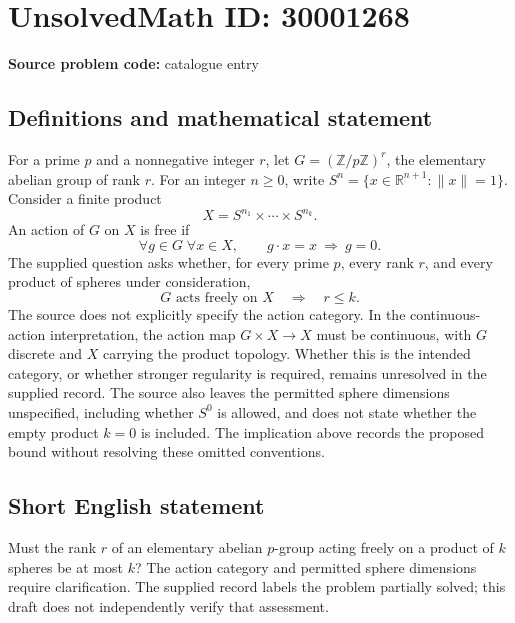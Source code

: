 \documentclass[11pt]{article}
\newcommand{\Z}{\mathbb{Z}}
\newcommand{\R}{\mathbb{R}}
\begin{document}
\section*{UnsolvedMath ID: 30001268}
\textbf{Source problem code:} catalogue entry
\subsection{Definitions and mathematical statement}
For a prime \(p\) and a nonnegative integer \(r\), let \(G=(\Z/p\Z)^r\), the elementary abelian group of rank \(r\). For an integer \(n\geq 0\), write \(S^n=\{x\in\R^{n+1}:\|x\|=1\}\). Consider a finite product
\[
X=S^{n_1}\times\cdots\times S^{n_k}.
\]
An action of \(G\) on \(X\) is free if
\[
\forall g\in G\;\forall x\in X,\qquad g\cdot x=x\ \Longrightarrow\ g=0.
\]
The supplied question asks whether, for every prime \(p\), every rank \(r\), and every product of spheres under consideration,
\[
G\text{ acts freely on }X\quad\Longrightarrow\quad r\leq k.
\]
The source does not explicitly specify the action category. In the continuous-action interpretation, the action map \(G\times X\to X\) must be continuous, with \(G\) discrete and \(X\) carrying the product topology. Whether this is the intended category, or whether stronger regularity is required, remains unresolved in the supplied record. The source also leaves the permitted sphere dimensions unspecified, including whether \(S^0\) is allowed, and does not state whether the empty product \(k=0\) is included. The implication above records the proposed bound without resolving these omitted conventions.
\subsection{Short English statement}
Must the rank \(r\) of an elementary abelian \(p\)-group acting freely on a product of \(k\) spheres be at most \(k\)? The action category and permitted sphere dimensions require clarification. The supplied record labels the problem partially solved; this draft does not independently verify that assessment.
\end{document}
